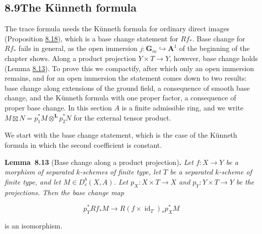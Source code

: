\documentclass[11pt]{article}
\newenvironment{bpstatement}[2]{\par\addvspace{0.6\baselineskip}\noindent\textbf{#1}#2\textbf{.}\enspace\ignorespaces}
  {\par\addvspace{0.4\baselineskip}}
\newenvironment{bpstatementit}[2]{\begin{bpstatement}{#1}{#2}\itshape\ignorespaces}{\end{bpstatement}}
\providecommand{\Dbc}{}\renewcommand{\Dbc}{D^b_c}
\begin{document}
\subsection*{\texorpdfstring{8.9\quad The Künneth formula}{8.9 The Künneth formula}}
\label{bp49}%
\label{bp50}%
The trace formula needs the Künneth formula for ordinary direct images (Proposition \hyperref[bp64]{8.18}), which is a base change statement for \(Rf_*\). Base change for \(Rf_*\) fails in general, as the open immersion \(j:\mathbf G_m\hookrightarrow\mathbf A^1\) of the beginning of the chapter shows. Along a product projection \(Y\times T\to Y\), however, base change holds (Lemma \hyperref[bp51]{8.13}). To prove this we compactify, after which only an open immersion remains, and for an open immersion the statement comes down to two results: base change along extensions of the ground field, a consequence of smooth base change, and the Künneth formula with one proper factor, a consequence of proper base change. In this section \(A\) is a finite admissible ring, and we write \(M\boxtimes N=p_1^*M\otimes^{\mathbf L}p_2^*N\) for the external tensor product.

We start with the base change statement, which is the case of the Künneth formula in which the second coefficient is constant.

\label{bp51}%
\begin{bpstatementit}{Lemma~8.13}{ (Base change along a product projection)}
Let \(f:X\to Y\) be a morphism of separated \(k\)-schemes of finite type, let \(T\) be a separated \(k\)-scheme of finite type, and let \(M\in\Dbc(X,A)\).  Let \(p_X:X\times T\to X\) and \(p_Y:Y\times T\to Y\) be the projections.  Then the base change map

\[
p_Y^*Rf_*M\longrightarrow R(f\times\operatorname{id}_T)_*p_X^*M
\]

is an isomorphism.
\end{bpstatementit}
\end{document}
